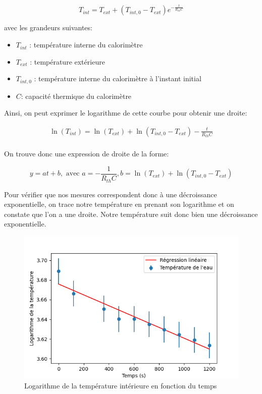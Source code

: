 \documentclass[12pt]{article}
\begin{document}
\begin{equation}
	T_{int} = T_{ext} + (T_{int, 0} - T_{ext}) e^{- \frac{t}{R_{th}C}}
\end{equation}

avec les grandeurs suivantes:
\begin{itemize}
	\item $T_{int}$ : température interne du calorimètre
	\item $T_{ext}$ : température extérieure
	\item $T_{int, 0}$ : température interne du calorimètre à l'instant initial
	\item $C$: capacité thermique du calorimètre
\end{itemize}

Ainsi, on peut exprimer le logarithme de cette courbe pour obtenir une droite:

\begin{align*}
	\ln(T_{int}) = \ln(T_{ext}) + \ln(T_{int, 0} - T_{ext}) - \frac{t}{R_{th}C} \\
\end{align*}

On trouve donc une expression de droite de la forme:

\begin{equation}
	y = at + b, \text{ avec } a = - \frac{1}{R_{th}C}, b = \ln(T_{ext}) + \ln(T_{int, 0} - T_{ext})
\end{equation}

Pour vérifier que nos mesures correspondent donc à une décroissance exponentielle, on trace notre température en prenant 
son logarithme et on constate que l'on a une droite. Notre température suit donc bien une décroissance exponentielle.
\begin{figure}[h!]
	\begin{center}
		\includegraphics[scale=0.7]{img/Figure_3.png}
	\end{center}
	\label{fig:graph3}
	\caption{Logarithme de la température intérieure en fonction du temps}
\end{figure}
\end{document}

